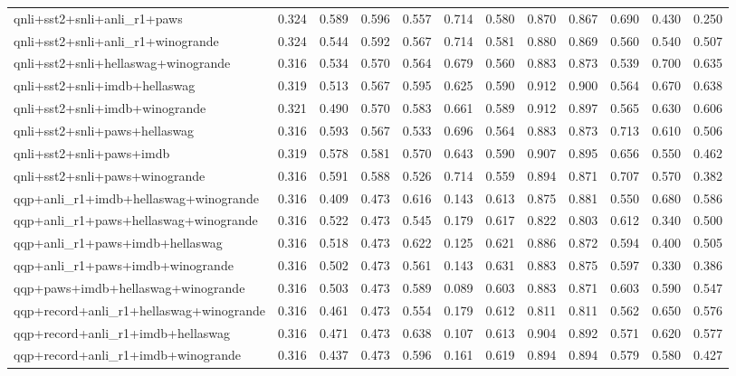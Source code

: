 \begin{table}[t]
\begin{tabular}{lrrrrrrrrrrr}
    qnli+sst2+snli+anli\_r1+paws & 0.324 & 0.589 & 0.596 & 0.557 & 0.714 & 0.580 & 0.870 & 0.867 & 0.690 & 0.430 & 0.250 \\
    qnli+sst2+snli+anli\_r1+winogrande & 0.324 & 0.544 & 0.592 & 0.567 & 0.714 & 0.581 & 0.880 & 0.869 & 0.560 & 0.540 & 0.507 \\
    qnli+sst2+snli+hellaswag+winogrande & 0.316 & 0.534 & 0.570 & 0.564 & 0.679 & 0.560 & 0.883 & 0.873 & 0.539 & 0.700 & 0.635 \\
    qnli+sst2+snli+imdb+hellaswag & 0.319 & 0.513 & 0.567 & 0.595 & 0.625 & 0.590 & 0.912 & 0.900 & 0.564 & 0.670 & 0.638 \\
    qnli+sst2+snli+imdb+winogrande & 0.321 & 0.490 & 0.570 & 0.583 & 0.661 & 0.589 & 0.912 & 0.897 & 0.565 & 0.630 & 0.606 \\
    qnli+sst2+snli+paws+hellaswag & 0.316 & 0.593 & 0.567 & 0.533 & 0.696 & 0.564 & 0.883 & 0.873 & 0.713 & 0.610 & 0.506 \\
    qnli+sst2+snli+paws+imdb & 0.319 & 0.578 & 0.581 & 0.570 & 0.643 & 0.590 & 0.907 & 0.895 & 0.656 & 0.550 & 0.462 \\
    qnli+sst2+snli+paws+winogrande & 0.316 & 0.591 & 0.588 & 0.526 & 0.714 & 0.559 & 0.894 & 0.871 & 0.707 & 0.570 & 0.382 \\
    qqp+anli\_r1+imdb+hellaswag+winogrande & 0.316 & 0.409 & 0.473 & 0.616 & 0.143 & 0.613 & 0.875 & 0.881 & 0.550 & 0.680 & 0.586 \\
    qqp+anli\_r1+paws+hellaswag+winogrande & 0.316 & 0.522 & 0.473 & 0.545 & 0.179 & 0.617 & 0.822 & 0.803 & 0.612 & 0.340 & 0.500 \\
    qqp+anli\_r1+paws+imdb+hellaswag & 0.316 & 0.518 & 0.473 & 0.622 & 0.125 & 0.621 & 0.886 & 0.872 & 0.594 & 0.400 & 0.505 \\
    qqp+anli\_r1+paws+imdb+winogrande & 0.316 & 0.502 & 0.473 & 0.561 & 0.143 & 0.631 & 0.883 & 0.875 & 0.597 & 0.330 & 0.386 \\
    qqp+paws+imdb+hellaswag+winogrande & 0.316 & 0.503 & 0.473 & 0.589 & 0.089 & 0.603 & 0.883 & 0.871 & 0.603 & 0.590 & 0.547 \\
    qqp+record+anli\_r1+hellaswag+winogrande & 0.316 & 0.461 & 0.473 & 0.554 & 0.179 & 0.612 & 0.811 & 0.811 & 0.562 & 0.650 & 0.576 \\
    qqp+record+anli\_r1+imdb+hellaswag & 0.316 & 0.471 & 0.473 & 0.638 & 0.107 & 0.613 & 0.904 & 0.892 & 0.571 & 0.620 & 0.577 \\
    qqp+record+anli\_r1+imdb+winogrande & 0.316 & 0.437 & 0.473 & 0.596 & 0.161 & 0.619 & 0.894 & 0.894 & 0.579 & 0.580 & 0.427 \\

\end{tabular}
\end{table}
